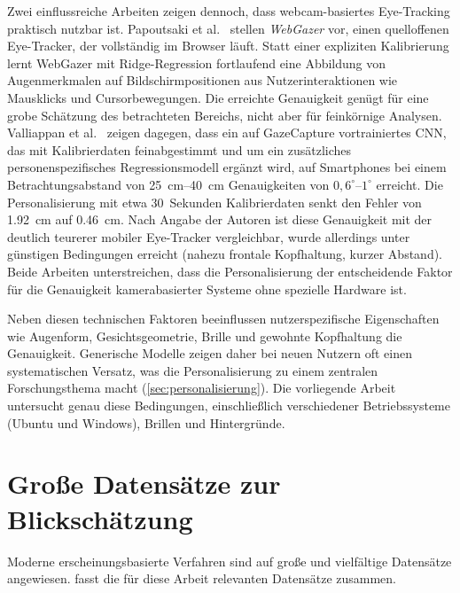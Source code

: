 \documentclass[
  11pt,
  a4paper,
  oneside,
  DIV=12,                 %
  BCOR=8mm,               %
  parskip=half,           %
  headings=normal,
  bibliography=totoc,     %
  listof=totoc            %
]{scrreprt}
\begin{document}
Zwei einflussreiche Arbeiten zeigen dennoch, dass webcam-basiertes Eye-Tracking praktisch nutzbar ist. Papoutsaki et al.~\cite{papoutsaki2016webgazer} stellen \emph{WebGazer} vor, einen quelloffenen Eye-Tracker, der vollständig im Browser läuft. Statt einer expliziten Kalibrierung lernt WebGazer mit Ridge-Regression fortlaufend eine Abbildung von Augenmerkmalen auf Bildschirmpositionen aus Nutzerinteraktionen wie Mausklicks und Cursorbewegungen. Die erreichte Genauigkeit genügt für eine grobe Schätzung des betrachteten Bereichs, nicht aber für feinkörnige Analysen. Valliappan et al.~\cite{valliappan2020smartphone} zeigen dagegen, dass ein auf GazeCapture vortrainiertes CNN, das mit Kalibrierdaten feinabgestimmt und um ein zusätzliches personenspezifisches Regressionsmodell ergänzt wird, auf Smartphones bei einem Betrachtungsabstand von \SIrange{25}{40}{\centi\metre} Genauigkeiten von $0,6^\circ$--$1^\circ$ erreicht. Die Personalisierung mit etwa 30~Sekunden Kalibrierdaten senkt den Fehler von \SI{1,92}{\centi\metre} auf \SI{0,46}{\centi\metre}. Nach Angabe der Autoren ist diese Genauigkeit mit der deutlich teurerer mobiler Eye-Tracker vergleichbar, wurde allerdings unter günstigen Bedingungen erreicht (nahezu frontale Kopfhaltung, kurzer Abstand). Beide Arbeiten unterstreichen, dass die Personalisierung der entscheidende Faktor für die Genauigkeit kamerabasierter Systeme ohne spezielle Hardware ist.

Neben diesen technischen Faktoren beeinflussen nutzerspezifische Eigenschaften wie Augenform, Gesichtsgeometrie, Brille und gewohnte Kopfhaltung die Genauigkeit. Generische Modelle zeigen daher bei neuen Nutzern oft einen systematischen Versatz, was die Personalisierung zu einem zentralen Forschungsthema macht (\cref{sec:personalisierung}). Die vorliegende Arbeit untersucht genau diese Bedingungen, einschließlich verschiedener Betriebssysteme (Ubuntu und Windows), Brillen und Hintergründe.

\section{Große Datensätze zur Blickschätzung}
\label{sec:datensaetze}
Moderne erscheinungsbasierte Verfahren sind auf große und vielfältige Datensätze angewiesen.  fasst die für diese Arbeit relevanten Datensätze zusammen.
\end{document}

